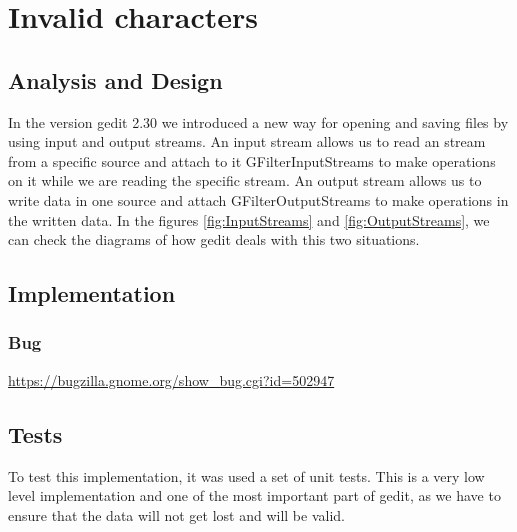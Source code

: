 
\chapter{Invalid characters}

\section{Analysis and Design}

In the version gedit 2.30 we introduced a new way for opening and saving files by using input and output streams. An input stream allows us to read an stream from a specific source and attach to it GFilterInputStreams to make operations on it while we are reading the specific stream. An output stream allows us to write data in one source and attach GFilterOutputStreams to make operations in the written data. In the figures \ref{fig:InputStreams} and \ref{fig:OutputStreams}, we can check the diagrams of how gedit deals with this two situations.



\section{Implementation}

\subsection{Bug}

\noindent\url{https://bugzilla.gnome.org/show_bug.cgi?id=502947}

\section{Tests}

To test this implementation, it was used a set of unit tests. This is a very low level implementation and one of the most important part of gedit, as we have to ensure that the data will not get lost and will be valid.

